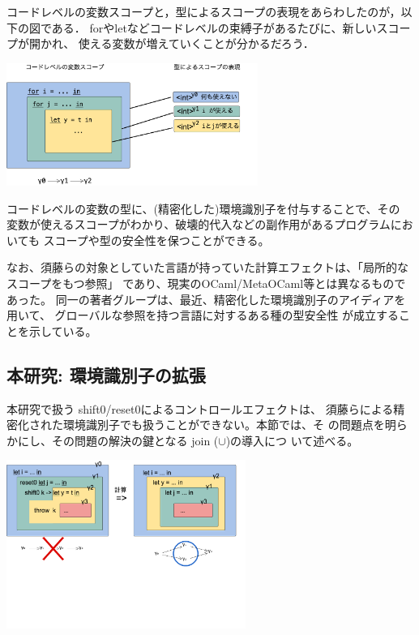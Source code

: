 コードレベルの変数スコープと，型によるスコープの表現をあらわしたのが，以下の図である．
forやletなどコードレベルの束縛子があるたびに、新しいスコープが開かれ、
使える変数が増えていくことが分かるだろう．
\begin{center}
  \includegraphics[clip,height=4cm]{./img/ec_for.png}
\end{center}

コードレベルの変数の型に、(精密化した)環境識別子を付与することで、その
変数が使えるスコープがわかり、破壊的代入などの副作用があるプログラムにおいても
スコープや型の安全性を保つことができる。

なお、須藤らの対象としていた言語が持っていた計算エフェクトは、「局所的なスコープをもつ参照」
であり、現実のOCaml/MetaOCaml等とは異なるものであった。
同一の著者グループは、最近、精密化した環境識別子のアイディアを用いて、
グローバルな参照を持つ言語に対するある種の型安全性
が成立することを示している\cite{Aplas2016}。

\subsection{本研究: 環境識別子の拡張}

本研究で扱う shift0/reset0によるコントロールエフェクトは、
須藤らによる精密化された環境識別子でも扱うことができない。本節では、そ
の問題点を明らかにし、その問題の解決の鍵となる join ($\cup$)の導入につ
いて述べる。

\begin{center}
  \includegraphics[clip,height=5.5cm]{./img/ecex_let.png}
\end{center}

